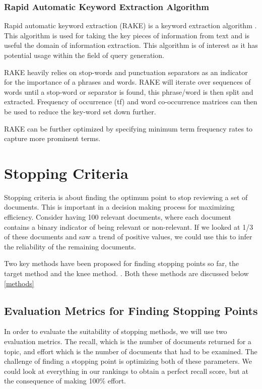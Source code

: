 \subsubsection{Rapid Automatic Keyword Extraction Algorithm} \label{rakelit}

Rapid automatic keyword extraction (RAKE) is a keyword extraction algorithm \cite{rake}. This algorithm is used for taking the key pieces of information from text and is useful the domain of information extraction. This algorithm is of interest as it has potential usage within the field of query generation.

RAKE heavily relies on stop-words and punctuation separators as an indicator for the importance of a phrases and words. RAKE will iterate over sequences of words until a stop-word or separator is found, this phrase/word is then split and extracted. Frequency of occurrence (tf) and word co-occurrence matrices can then be used to reduce the key-word set down further.

RAKE can be further optimized by specifying minimum term frequency rates to capture more prominent terms.

\fi

\section{Stopping Criteria} \label{stops}

Stopping criteria is about finding the optimum point to stop reviewing a set of documents. This is important in a decision making process for maximizing efficiency. Consider having 100 relevant documents, where each document contains a binary indicator of being relevant or non-relevant. If we looked at 1/3 of these documents and saw a trend of positive values, we could use this to infer the reliability of the remaining documents.

Two key methods have been proposed for finding stopping points so far, the target method \cite{Satopa11} and the knee method. \cite{Cormack2016}. Both these methods are discussed below \ref{methods}



\subsection{Evaluation Metrics for Finding Stopping Points} \label{evalsstops}

In order to evaluate the suitability of stopping methods, we will use two evaluation metrics. The recall, which is the number of documents returned for a topic, and effort which is the number of documents that had to be examined. The challenge of finding a stopping point is optimizing both of these parameters. We could look at everything in our rankings to obtain a perfect recall score, but at the consequence of making 100\% effort.

